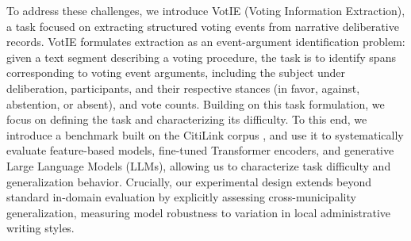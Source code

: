 \documentclass[11pt]{article}
\begin{document}



To address these challenges, we introduce VotIE (Voting Information Extraction), a task focused on extracting structured voting events from narrative deliberative records. VotIE formulates extraction as an event-argument identification problem: given a text segment describing a voting procedure, the task is to identify spans corresponding to voting event arguments, including the subject under deliberation, participants, and their respective stances (in favor, against, abstention, or absent), and vote counts. Building on this task formulation, we focus on defining the task and characterizing its difficulty. To this end, we introduce a benchmark built on the CitiLink corpus \cite{CitiLinkMinutes2025}, and use it to systematically evaluate feature-based models, fine-tuned Transformer encoders, and generative Large Language Models (LLMs), allowing us to characterize task difficulty and generalization behavior. Crucially, our experimental design extends beyond standard in-domain evaluation by explicitly assessing cross-municipality generalization, measuring model robustness to variation in local administrative writing styles.
\end{document}
